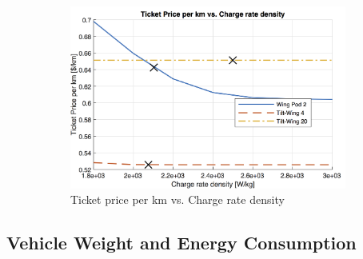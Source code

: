 \begin{figure}[h]
\begin{subfigure}[t]{0.33\textwidth}
    \includegraphics[width=\textwidth]{Figures/CRate_TPrice_perkmNOPAD.png}
    \captionsetup{justification=centering}
    \caption{Ticket price per km vs. Charge rate density}
    \label{fig:sens7}
\end{subfigure}
\captionsetup{justification=centering}
\caption{}
\label{fig:sens123}
\end{figure}


\subsection{Vehicle Weight and Energy Consumption}

